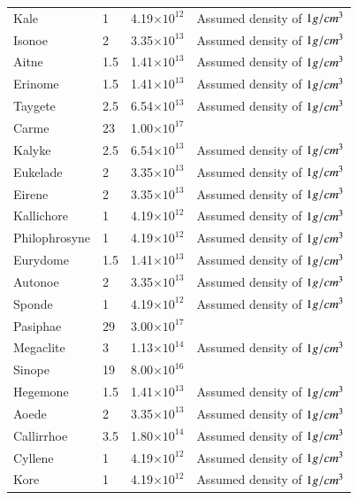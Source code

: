 \documentclass{aa}
\begin{document}
\begin{appendix}
\begin{table}[!ht]
\begin{tabular}{llll}
        Kale & 1 & 4.19$\times 10^{12 }$ & Assumed density of $1 \space g/cm^3$ \\ 
        Isonoe & 2 & 3.35$\times 10^{13 }$ & Assumed density of $1 \space g/cm^3$ \\ 
        Aitne & 1.5 & 1.41$\times 10^{13 }$ & Assumed density of $1 \space g/cm^3$ \\ 
        Erinome & 1.5 & 1.41$\times 10^{13 }$ & Assumed density of $1 \space g/cm^3$ \\ 
        Taygete & 2.5 & 6.54$\times 10^{13 }$ & Assumed density of $1 \space g/cm^3$ \\ 
        Carme & 23 & 1.00$\times 10^{17 }$ & \cite{Williams_NSSDCA_JovianFact} \\ 
        Kalyke & 2.5 & 6.54$\times 10^{13 }$ & Assumed density of $1 \space g/cm^3$ \\ 
        Eukelade & 2 & 3.35$\times 10^{13 }$ & Assumed density of $1 \space g/cm^3$ \\ 
        Eirene & 2 & 3.35$\times 10^{13 }$ & Assumed density of $1 \space g/cm^3$ \\ 
        Kallichore & 1 & 4.19$\times 10^{12 }$ & Assumed density of $1 \space g/cm^3$ \\ 
        Philophrosyne & 1 & 4.19$\times 10^{12 }$ & Assumed density of $1 \space g/cm^3$ \\ 
        Eurydome & 1.5 & 1.41$\times 10^{13 }$ & Assumed density of $1 \space g/cm^3$ \\ 
        Autonoe & 2 & 3.35$\times 10^{13 }$ & Assumed density of $1 \space g/cm^3$ \\ 
        Sponde & 1 & 4.19$\times 10^{12 }$ & Assumed density of $1 \space g/cm^3$ \\ 
        Pasiphae & 29 & 3.00$\times 10^{17 }$ & \cite{Williams_NSSDCA_JovianFact} \\ 
        Megaclite & 3 & 1.13$\times 10^{14 }$ & Assumed density of $1 \space g/cm^3$ \\ 
        Sinope & 19 & 8.00$\times 10^{16 }$ & \cite{Williams_NSSDCA_JovianFact} \\ 
        Hegemone & 1.5 & 1.41$\times 10^{13 }$ & Assumed density of $1 \space g/cm^3$ \\ 
        Aoede & 2 & 3.35$\times 10^{13 }$ & Assumed density of $1 \space g/cm^3$ \\ 
        Callirrhoe & 3.5 & 1.80$\times 10^{14 }$ & Assumed density of $1 \space g/cm^3$ \\ 
        Cyllene & 1 & 4.19$\times 10^{12 }$ & Assumed density of $1 \space g/cm^3$ \\ 
        Kore & 1 & 4.19$\times 10^{12 }$ & Assumed density of $1 \space g/cm^3$ \\ \hline
    \end{tabular}
\end{table}
    

\end{appendix}
\end{document}
